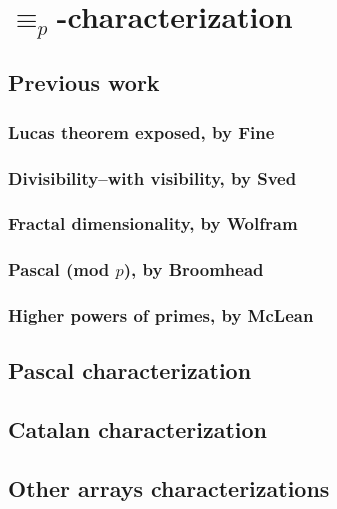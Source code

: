 
\chapter{$\equiv_{p}$-characterization}

\section{Previous work}
\subsection{Lucas theorem exposed, by Fine}
\subsection{Divisibility--with visibility, by Sved}
\subsection{Fractal dimensionality, by Wolfram}
\subsection{Pascal (mod $p$), by Broomhead}
\subsection{Higher powers of primes, by McLean}

\section{Pascal characterization}
\section{Catalan characterization}
\section{Other arrays characterizations}
